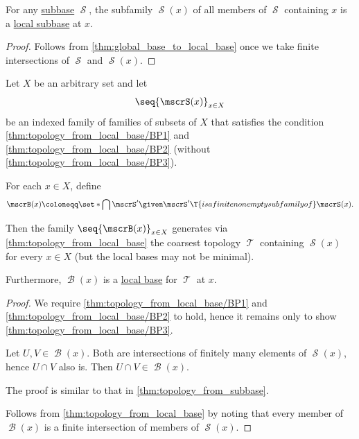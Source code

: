 \begin{proposition}\label{thm:global_subbase_to_local_subbase}
  For any \hyperref[def:topological_subbase]{subbase} \( \mscrS \), the subfamily \( \mscrS(x) \) of all members of \( \mscrS \) containing \( x \) is a \hyperref[def:topological_local_subbase]{local subbase} at \( x \).
\end{proposition}
\begin{proof}
  Follows from \cref{thm:global_base_to_local_base} once we take finite intersections of \( \mscrS \) and \( \mscrS(x) \).
\end{proof}

\begin{proposition}\label{thm:topology_from_local_subbase}
  Let \( X \) be an arbitrary set and let
  \begin{equation*}
    \seq{ \mscrS(x) }_{x \in X}
  \end{equation*}
  be an indexed family of families of subsets of \( X \) that satisfies the condition \ref{thm:topology_from_local_base/BP1} and \ref{thm:topology_from_local_base/BP2} (without \ref{thm:topology_from_local_base/BP3}).

  For each \( x \in X \), define
  \begin{equation*}
    \mscrB(x) \coloneqq \set*{ \bigcap \mscrS' \given \mscrS' \T{is a finite nonempty subfamily of} \mscrS(x) }.
  \end{equation*}

  Then the family \( \seq{ \mscrB(x) }_{x \in X} \) generates via \cref{thm:topology_from_local_base} the coarsest topology \( \mscrT \) containing \( \mscrS(x) \) for every \( x \in X \) (but the local bases may not be minimal).

  Furthermore, \( \mscrB(x) \) is a \hyperref[def:topological_local_base]{local base} for \( \mscrT \) at \( x \).
\end{proposition}
\begin{proof}
   We require \ref{thm:topology_from_local_base/BP1} and \ref{thm:topology_from_local_base/BP2} to hold, hence it remains only to show \ref{thm:topology_from_local_base/BP3}.

  Let \( U, V \in \mscrB(x) \). Both are intersections of finitely many elements of \( \mscrS(x) \), hence \( U \cap V \) also is. Then \( U \cap V \in \mscrB(x) \).

   The proof is similar to that in \cref{thm:topology_from_subbase}.

   Follows from \cref{thm:topology_from_local_base} by noting that every member of \( \mscrB(x) \) is a finite intersection of members of \( \mscrS(x) \).
\end{proof}

